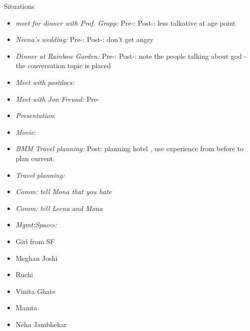 \documentclass[serif, mathserif, final]{beamer}
\begin{document}
\begin{frame}{}
\begin{columns}
\begin{column}{0.20\linewidth}
\begin{block}{Situations}
\begin{itemize}
        \item \tiny \textit{meet for dinner with Prof. Gropp:} Pre-:
          Post-: less talkative at age point 
        \item \tiny \textit{Neena's wedding:} Pre-:  Post-:  don't get angry
        \item \tiny \textit{Dinner at Rainbow Garden:} Pre-:  Post-:
          note the people talking about god - the conversation topic
          is placed 
          
        \item \tiny \textit{Meet with postdocs:}
        \item \tiny \textit{Meet with Jon Freund:} Pre- 
        \item \tiny \textit{Presentation}:             
        \item \tiny \textit{Movie}: 
          
        \item \tiny \textit{BMM Travel planning:} Post: planning
          hotel , use experience from before to plan current. 
        \item \tiny \textit{Travel planning:} 
          
        \item \tiny \textit{Comm: tell Mona that you hate} 
        \item \tiny \textit{Comm: tell Leena and Mona} 
          
        \item \tiny \textit{Mgmt:Spaces:} 
    \end{itemize} 

  \end{block}

\begin{block} 

\begin{itemize} 
\small \item \small Girl from SF 
\small \item \small Meghan Joshi 
\small \item \small Ruchi 
\small \item \small Vinita Ghate 

\small \item \small Mamta
\small \item \small Neha Jambhekar 
\end{itemize} 

\end{block} 
\end{column}%

\end{columns}

\end{frame}
\end{document}
